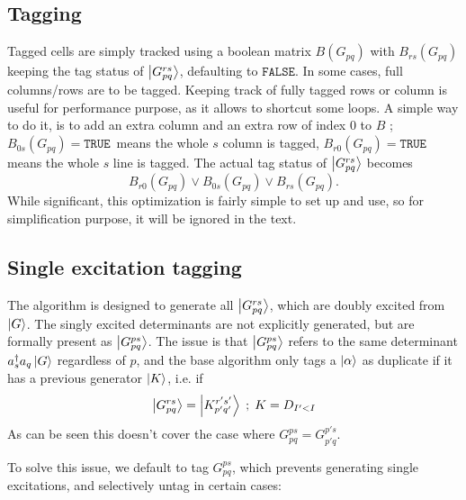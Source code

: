 \documentclass[./thesis.tex]{subfiles}
\newcommand{\Gpqrs}{\ket{G^{rs}_{pq}}}
\begin{document}
\subsection{Tagging}

Tagged cells are simply tracked using a boolean matrix $B(G_{pq})$ with $B_{rs}(G_{pq})$ keeping the tag status of $\Gpqrs$, defaulting to $\mathtt{FALSE}$. 
In some cases, full columns/rows are to be tagged. Keeping track of fully tagged rows or column is useful for performance purpose, as it allows to shortcut some loops. A simple way to do it, is to add an extra column and an extra row of index $0$ to $B$ ; $B_{0s}(G_{pq}) = \mathtt{TRUE}\,$ means the whole $s$ column is tagged, $B_{r0}(G_{pq}) = \mathtt{TRUE}\,$ means the whole $s$ line is tagged. The actual tag status of $\Gpqrs$ becomes
\begin{equation}
B_{r0}(G_{pq}) \vee B_{0s}(G_{pq}) \vee B_{rs}(G_{pq}).
\end{equation}
While significant, this optimization is fairly simple to set up and use, so for simplification purpose, it will be ignored in the text.


\subsection{Single excitation tagging}
\label{single_tagging}
The algorithm is designed to generate all $\ket {G_{pq}^{rs}}$, which are doubly excited from $\ket G$. The singly excited determinants are not explicitly generated, but are formally present as $\ket{G_{pq}^{ps}}$.
The issue is that $\ket{G_{pq}^{ps}}$ refers to the same determinant $a^\dagger_s a_q \ket{G}$ regardless of $p$, and the base algorithm only tags a ${\ket{\alpha}}$ as duplicate if it has a previous generator $\ket K$, i.e. if
\begin{equation}
\ket {G_{pq}^{rs}} = \ket {K_{p'q'}^{r's'}} \; ; \; K = D_{I'<I}
\end{equation}
As can be seen this doesn't cover the case where $G_{pq}^{ps} = G_{p'q}^{p's}$.

To solve this issue, we default to tag $G_{pq}^{ps}$, which prevents generating single excitations, and selectively untag in certain cases:
\end{document}
